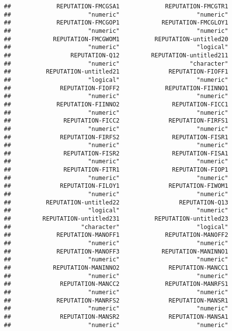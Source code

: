 \documentclass[
]{article}
\begin{document}
\begin{verbatim}
##             REPUTATION-FMCGSA1             REPUTATION-FMCGTR1 
##                      "numeric"                      "numeric" 
##             REPUTATION-FMCGOP1            REPUTATION-FMCGLOY1 
##                      "numeric"                      "numeric" 
##            REPUTATION-FMCGWOM1          REPUTATION-untitled20 
##                      "numeric"                      "logical" 
##                 REPUTATION-Q12         REPUTATION-untitled211 
##                      "numeric"                    "character" 
##          REPUTATION-untitled21              REPUTATION-FIOFF1 
##                      "logical"                      "numeric" 
##              REPUTATION-FIOFF2             REPUTATION-FIINNO1 
##                      "numeric"                      "numeric" 
##             REPUTATION-FIINNO2               REPUTATION-FICC1 
##                      "numeric"                      "numeric" 
##               REPUTATION-FICC2              REPUTATION-FIRFS1 
##                      "numeric"                      "numeric" 
##              REPUTATION-FIRFS2               REPUTATION-FISR1 
##                      "numeric"                      "numeric" 
##               REPUTATION-FISR2               REPUTATION-FISA1 
##                      "numeric"                      "numeric" 
##               REPUTATION-FITR1               REPUTATION-FIOP1 
##                      "numeric"                      "numeric" 
##              REPUTATION-FILOY1              REPUTATION-FIWOM1 
##                      "numeric"                      "numeric" 
##          REPUTATION-untitled22                 REPUTATION-Q13 
##                      "logical"                      "numeric" 
##         REPUTATION-untitled231          REPUTATION-untitled23 
##                    "character"                      "logical" 
##             REPUTATION-MANOFF1             REPUTATION-MANOFF2 
##                      "numeric"                      "numeric" 
##             REPUTATION-MANOFF3            REPUTATION-MANINNO1 
##                      "numeric"                      "numeric" 
##            REPUTATION-MANINNO2              REPUTATION-MANCC1 
##                      "numeric"                      "numeric" 
##              REPUTATION-MANCC2             REPUTATION-MANRFS1 
##                      "numeric"                      "numeric" 
##             REPUTATION-MANRFS2              REPUTATION-MANSR1 
##                      "numeric"                      "numeric" 
##              REPUTATION-MANSR2              REPUTATION-MANSA1 
##                      "numeric"                      "numeric" 

\end{verbatim}
\end{document}
